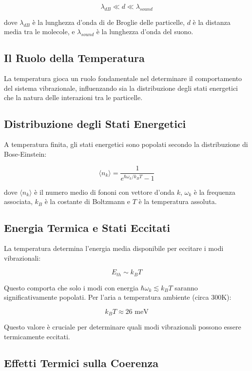 \documentclass[a4paper,11pt]{article}
\begin{document}
\[\lambda_{dB} \ll d \ll \lambda_{sound}\]

dove \(\lambda_{dB}\) è la lunghezza d'onda di de Broglie delle
particelle, \(d\) è la distanza media tra le molecole, e
\(\lambda_{sound}\) è la lunghezza d'onda del suono.

\subsection{Il Ruolo della
Temperatura}\label{il-ruolo-della-temperatura}

La temperatura gioca un ruolo fondamentale nel determinare il
comportamento del sistema vibrazionale, influenzando sia la
distribuzione degli stati energetici che la natura delle interazioni tra
le particelle.

\subsection{Distribuzione degli Stati
Energetici}\label{distribuzione-degli-stati-energetici}

A temperatura finita, gli stati energetici sono popolati secondo la
distribuzione di Bose-Einstein:

\[\langle n_k \rangle = \frac{1}{e^{\hbar\omega_k/k_BT} - 1}\]

dove \(\langle n_k \rangle\) è il numero medio di fononi con vettore
d'onda \(k\), \(\omega_k\) è la frequenza associata, \(k_B\) è la
costante di Boltzmann e \(T\) è la temperatura assoluta.

\subsection{Energia Termica e Stati
Eccitati}\label{energia-termica-e-stati-eccitati}

La temperatura determina l'energia media disponibile per eccitare i modi
vibrazionali:

\[E_{th} \sim k_BT\]

Questo comporta che solo i modi con energia
\(\hbar\omega_k \lesssim k_BT\) saranno significativamente popolati. Per
l'aria a temperatura ambiente (circa 300K):

\[k_BT \approx 26 \text{ meV}\]

Questo valore è cruciale per determinare quali modi vibrazionali possono
essere termicamente eccitati.

\subsection{Effetti Termici sulla
Coerenza}\label{effetti-termici-sulla-coerenza}
\end{document}
